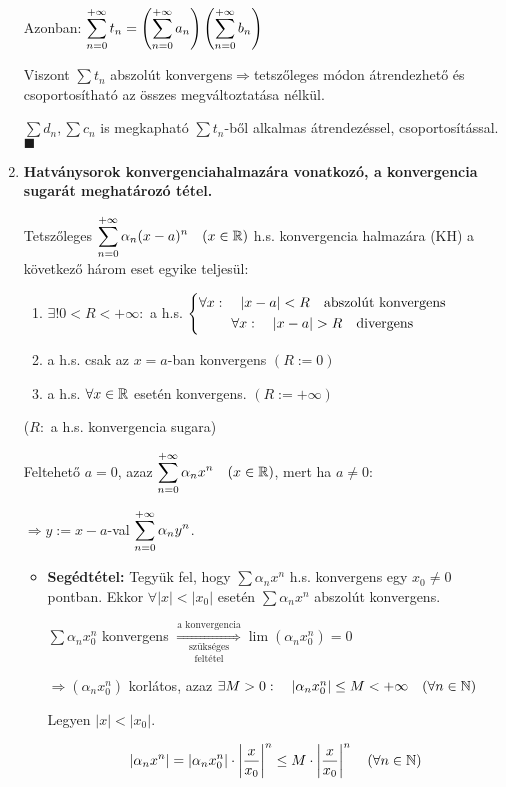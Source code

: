 \documentclass[a4paper,11.5pt]{article}
\begin{document}
\begin{enumerate}
		Azonban: $\displaystyle\sum_{n=0}^{+\infty} t_n=\left(\displaystyle\sum_{n=0}^{+\infty} a_n\right)\left(\displaystyle\sum_{n=0}^{+\infty} b_n\right)$
		
		Viszont $\sum t_n$ \quad abszolút konvergens\quad$\Rightarrow$\quad tetszőleges módon átrendezhető és csoportosítható az összes megváltoztatása nélkül.
		
		$\sum d_n, \sum c_n$ is megkapható $\sum t_n$-ből alkalmas átrendezéssel, csoportosítással. \quad$\blacksquare$
		
		\item \textbf{Hatványsorok konvergenciahalmazára vonatkozó, a konvergencia sugarát meghatározó tétel.}
		
		Tetszőleges $\displaystyle\sum_{n=0}^{+\infty} \alpha_n(x-a)^n \quad (x\in\mathbb{R})$ h.s. konvergencia halmazára (KH) a következő három eset egyike teljesül:
		\begin{enumerate}
			\item $\exists! 0<R<+\infty: $ \quad a h.s. $\left\{\begin{gathered}
				\forall x:\quad |x-a|<R\text{\quad abszolút konvergens}\\
				\forall x:\quad |x-a|>R\text{\quad divergens}
			\end{gathered}\right.$
			\item a h.s. csak az $x=a$-ban konvergens $(R:=0)$
			\item a h.s. $\forall x \in \mathbb{R}$ esetén konvergens. $(R:=+\infty)$
		\end{enumerate}
		($R: $ a h.s. konvergencia sugara)
		
		\biz Feltehető $a=0$, azaz $\displaystyle\sum_{n=0}^{+\infty} \alpha_nx^n \quad (x\in\mathbb{R})$, mert ha $a\not=0:$
		
		$ \Rightarrow y:=x-a$-val \quad $\displaystyle\sum_{n=0}^{+\infty} \alpha_ny^n$.
		
		\begin{itemize}[~~~~~~~~~]
			\item \textbf{Segédtétel:} Tegyük fel, hogy $\sum\alpha_nx^n$ h.s. konvergens egy $x_0\not=0$ pontban. Ekkor $\forall |x|<|x_0|$ esetén $\sum\alpha_nx^n$ abszolút konvergens.
			
			\biz $\sum\alpha_nx_0^n$ konvergens $\overset{\text{a konvergencia}}{\underset{\text{feltétel}}{\underset{\text{szükséges}}{\Longrightarrow}}}\lim(\alpha_nx^n_0)=0$ 
			
			$\Rightarrow(\alpha_nx^n_0)$ korlátos, azaz $\exists M>0:\quad |\alpha_nx^n_0|\leq M<+\infty \quad (\forall n\in\mathbb{N})$
			
			Legyen $|x|<|x_0|$.
			
			\[ \left|\alpha_nx^n\right|=\left|\alpha_nx^n_0\right|\cdot\left|\frac{x}{x_0}\right|^n\leq M\cdot\left|\frac{x}{x_0}\right|^n \quad (\forall n \in \mathbb{N}) \]
			

\end{itemize}
\end{enumerate}
\end{document}
